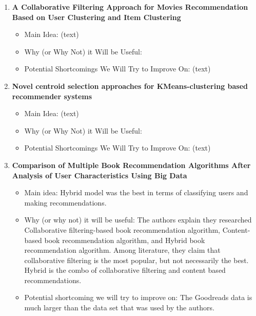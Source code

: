 \begin{enumerate}[label=(\arabic*)]
    \item \cite{jagadev2018collaborative} \textbf{A Collaborative Filtering Approach for Movies Recommendation Based on User Clustering and Item Clustering}
    \begin{itemize}
        \item Main Idea: (text)
        \item Why (or Why Not) it Will be Useful:
        \item Potential Shortcomings We Will Try to Improve On: (text)
    \end{itemize}
    \item \cite{zahra2015novel} \textbf{Novel centroid selection approaches for KMeans-clustering based recommender systems}
    \begin{itemize}
        \item Main Idea: (text)
        \item Why (or Why Not) it Will be Useful:
        \item Potential Shortcomings We Will Try to Improve On: (text)
    \end{itemize}
    \item \cite{wang2023comparison} \textbf{Comparison of Multiple Book Recommendation Algorithms After Analysis of User Characteristics Using Big Data}
    \begin{itemize}
        \item Main idea: Hybrid model was the best in terms of classifying users and making recommendations.
        \item Why (or why not) it will be useful: The authors explain they researched Collaborative filtering-based book recommendation algorithm,  Content-based book recommendation algorithm, and Hybrid book recommendation algorithm. Among literature, they claim that collaborative filtering is the most popular, but not necessarily the best. Hybrid is the combo of collaborative filtering and content based recommendations.
        \item Potential shortcoming we will try to improve on: The Goodreads data is much larger than the data set that was used by the authors.

\end{itemize}
\end{enumerate}
